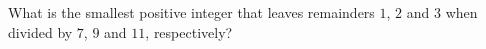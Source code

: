 What is the smallest positive integer that leaves remainders $1$, $2$ and $3$ when divided by $7$, $9$ and $11$, respectively?
